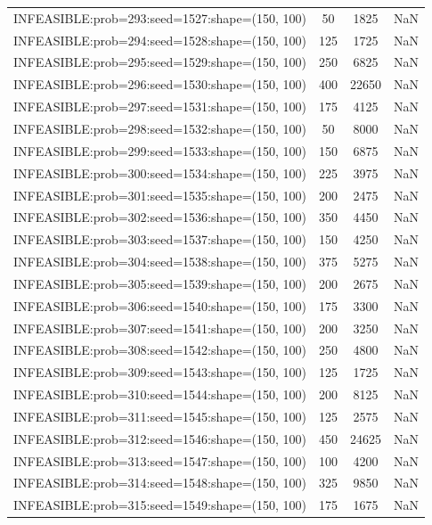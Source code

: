 \begin{longtable}{lccc}
INFEASIBLE:prob=293:seed=1527:shape=(150, 100) &       50 &  1825 &    NaN \\
INFEASIBLE:prob=294:seed=1528:shape=(150, 100) &      125 &  1725 &    NaN \\
INFEASIBLE:prob=295:seed=1529:shape=(150, 100) &      250 &  6825 &    NaN \\
INFEASIBLE:prob=296:seed=1530:shape=(150, 100) &      400 & 22650 &    NaN \\
INFEASIBLE:prob=297:seed=1531:shape=(150, 100) &      175 &  4125 &    NaN \\
INFEASIBLE:prob=298:seed=1532:shape=(150, 100) &       50 &  8000 &    NaN \\
INFEASIBLE:prob=299:seed=1533:shape=(150, 100) &      150 &  6875 &    NaN \\
INFEASIBLE:prob=300:seed=1534:shape=(150, 100) &      225 &  3975 &    NaN \\
INFEASIBLE:prob=301:seed=1535:shape=(150, 100) &      200 &  2475 &    NaN \\
INFEASIBLE:prob=302:seed=1536:shape=(150, 100) &      350 &  4450 &    NaN \\
INFEASIBLE:prob=303:seed=1537:shape=(150, 100) &      150 &  4250 &    NaN \\
INFEASIBLE:prob=304:seed=1538:shape=(150, 100) &      375 &  5275 &    NaN \\
INFEASIBLE:prob=305:seed=1539:shape=(150, 100) &      200 &  2675 &    NaN \\
INFEASIBLE:prob=306:seed=1540:shape=(150, 100) &      175 &  3300 &    NaN \\
INFEASIBLE:prob=307:seed=1541:shape=(150, 100) &      200 &  3250 &    NaN \\
INFEASIBLE:prob=308:seed=1542:shape=(150, 100) &      250 &  4800 &    NaN \\
INFEASIBLE:prob=309:seed=1543:shape=(150, 100) &      125 &  1725 &    NaN \\
INFEASIBLE:prob=310:seed=1544:shape=(150, 100) &      200 &  8125 &    NaN \\
INFEASIBLE:prob=311:seed=1545:shape=(150, 100) &      125 &  2575 &    NaN \\
INFEASIBLE:prob=312:seed=1546:shape=(150, 100) &      450 & 24625 &    NaN \\
INFEASIBLE:prob=313:seed=1547:shape=(150, 100) &      100 &  4200 &    NaN \\
INFEASIBLE:prob=314:seed=1548:shape=(150, 100) &      325 &  9850 &    NaN \\
INFEASIBLE:prob=315:seed=1549:shape=(150, 100) &      175 &  1675 &    NaN \\

\end{longtable}
